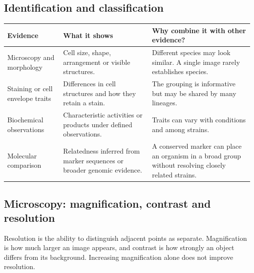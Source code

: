 \documentclass[12pt,a4paper]{article}
\begin{document}
\subsection{Identification and classification}
\par\vspace{5pt}
\begingroup
\setlength{\extrarowheight}{1pt}
\noindent\begin{tabularx}{\linewidth}{|B{3.45cm}|Y|Y|}
\hline
\textbf{Evidence} & \textbf{What it shows} & \textbf{Why combine it with other evidence?} \\ \hline
Microscopy and morphology & Cell size, shape, arrangement or visible structures. & Different species may look similar. A single image rarely establishes species. \\ \hline
Staining or cell envelope traits & Differences in cell structures and how they retain a stain. & The grouping is informative but may be shared by many lineages. \\ \hline
Biochemical observations & Characteristic activities or products under defined observations. & Traits can vary with conditions and among strains. \\ \hline
Molecular comparison & Relatedness inferred from marker sequences or broader genomic evidence. & A conserved marker can place an organism in a broad group without resolving closely related strains. \\ \hline
\end{tabularx}\par
\endgroup
\subsection{Microscopy: magnification, contrast and resolution}
\begin{tcolorbox}[defbox, title={Resolution}]
Resolution is the ability to distinguish adjacent points as separate. Magnification is how much larger an image appears, and contrast is how strongly an object differs from its background. Increasing magnification alone does not improve resolution.
\end{tcolorbox}
\end{document}
